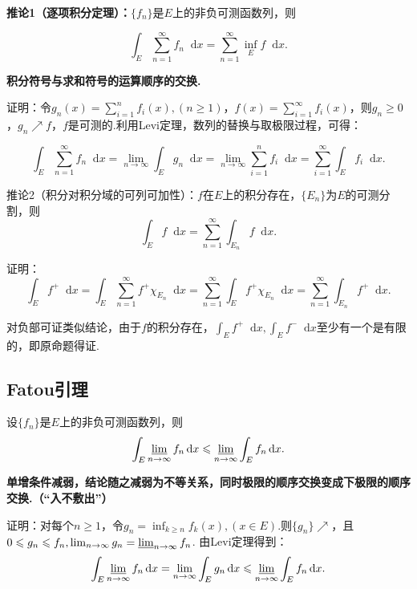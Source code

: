 \documentclass[bwprint, withoutpreface]{cumcmthesis}
\newcommand*{\dif}{\mathop{}\!\mathrm{d}}
\begin{document}
\textbf{推论1（逐项积分定理）：}$\{f_n\}$是$E$上的非负可测函数列，则

\begin{equation*}
	\int_E \sum_{n = 1}^{\infty}{f_n} \dif x = \sum_{n = 1}^{\infty}{\inf_E f \dif x}.
\end{equation*}

\textbf{积分符号与求和符号的运算顺序的交换.}

证明：令$g_n(x) = \sum_{i = 1}^{n}{f_i(x)},(n \geqslant 1)$，$f(x) = \sum_{i = 1}^{\infty}{f_i(x)}$，则$g_n \geqslant 0$，$g_n \nearrow f$，$f$是可测的.利用Levi定理，数列的替换与取极限过程，可得：

\begin{equation*}
	\int_E \sum_{n = 1}^{\infty}{f_n \dif x} = \lim_{n \to \infty}{\int_E g_n \dif x} = \lim_{n \to \infty}{\sum_{i = 1}^{n}{f_i} \dif x} = \sum_{i = 1}^{\infty}\int_E f_i \dif x.	
\end{equation*}

推论2（积分对积分域的可列可加性）：$f$在$E$上的积分存在，$\{E_n\}$为$E$的可测分割，则\[ \int_E f \dif x = \sum_{n = 1}^{\infty}{\int_{E_n} f \dif x}. \]

证明：
\begin{equation*}
	\int_E f^+ \dif x = \int_E \sum_{n = 1}^{\infty}{f^+ \chi_{E_n} \dif x} = \sum_{n = 1}^{\infty}{\int_E f^+ \chi_{E_n} \dif x} = \sum_{n = 1}^{\infty}{\int_{E_n} f^+ \dif x}.
\end{equation*}

对负部可证类似结论，由于$f$的积分存在，$\int_E f^+ \dif x, \int_E f^- \dif x $至少有一个是有限的，即原命题得证.

\subsection{Fatou引理}
设$\{f_n\}$是$E$上的非负可测函数列，则
\begin{equation*}
	\int_E \varliminf_{n \to \infty} f_n \dif x \leqslant \varliminf_{n \to \infty} \int_E f_n \dif x. 
\end{equation*}

\textbf{单增条件减弱，结论随之减弱为不等关系，同时极限的顺序交换变成下极限的顺序交换.（“入不敷出”）}

证明：对每个$n \geqslant 1$，令$g_n = \inf_{k \geqslant n}{f_k(x)}, (x \in E)$.则$\{g_n\} \nearrow$，且$0 \leqslant g_n \leqslant f_n, \lim_{n \to \infty}{g_n} = \varliminf_{n \to \infty}{f_n}$. 由Levi定理得到：
\begin{equation*}
	\int_E \varliminf_{n \to \infty}{f_n} \dif x = \lim_{n \to \infty}{\int_E g_n \dif x \leqslant \varliminf_{n \to \infty}{\int_E f_n \dif x}}.
\end{equation*}
\end{document}
